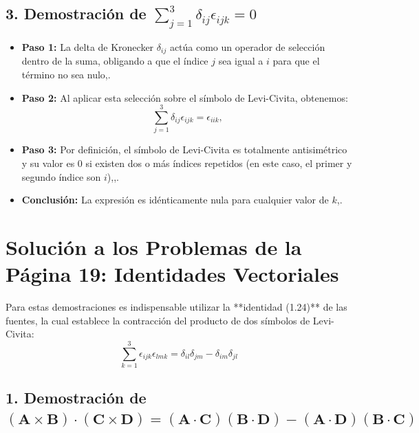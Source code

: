 \documentclass[a4paper]{article}
\begin{document}
\subsection*{3. Demostración de $\sum_{j=1}^3 \delta_{ij} \epsilon_{ijk} = 0$}
\begin{itemize}
    \item \textbf{Paso 1:} La delta de Kronecker $\delta_{ij}$ actúa como un operador de selección dentro de la suma, obligando a que el índice $j$ sea igual a $i$ para que el término no sea nulo,.
    \item \textbf{Paso 2:} Al aplicar esta selección sobre el símbolo de Levi-Civita, obtenemos:
    \begin{equation}
        \sum_{j=1}^{3} \delta_{ij} \epsilon_{ijk} = \epsilon_{iik} \text{,}
    \end{equation}
    \item \textbf{Paso 3:} Por definición, el símbolo de Levi-Civita es totalmente antisimétrico y su valor es $0$ si existen dos o más índices repetidos (en este caso, el primer y segundo índice son $i$),,.
    \item \textbf{Conclusión:} La expresión es idénticamente nula para cualquier valor de $k$,.
\end{itemize}


\section*{Solución a los Problemas de la Página 19: Identidades Vectoriales}


Para estas demostraciones es indispensable utilizar la **identidad (1.24)** de las fuentes, la cual establece la contracción del producto de dos símbolos de Levi-Civita:
\begin{equation}
    \sum_{k=1}^{3} \epsilon_{ijk} \epsilon_{lmk} = \delta_{il}\delta_{jm} - \delta_{im}\delta_{jl} \text{}
\end{equation}


\subsection*{1. Demostración de $(\mathbf{A} \times \mathbf{B}) \cdot (\mathbf{C} \times \mathbf{D}) = (\mathbf{A} \cdot \mathbf{C})(\mathbf{B} \cdot \mathbf{D}) - (\mathbf{A} \cdot \mathbf{D})(\mathbf{B} \cdot \mathbf{C})$}
\end{document}
